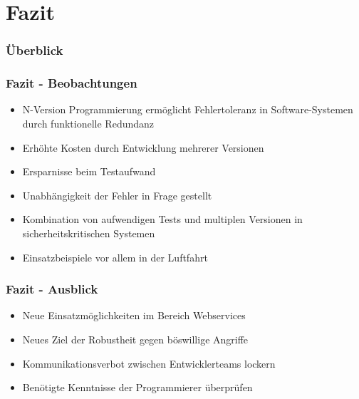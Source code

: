 \section{Fazit}
\begin{frame}
	\frametitle{Überblick}
	\tableofcontents[currentsection]
\end{frame}
%
\begin{frame}
	\frametitle{Fazit - Beobachtungen}

	\begin{itemize}
		\item N-Version Programmierung ermöglicht Fehlertoleranz in Software-Systemen durch funktionelle Redundanz
		\item Erhöhte Kosten durch Entwicklung mehrerer Versionen
		\item Ersparnisse beim Testaufwand
		\item Unabhängigkeit der Fehler in Frage gestellt
		\item Kombination von aufwendigen Tests und multiplen Versionen in sicherheitskritischen Systemen		
		\item Einsatzbeispiele vor allem in der Luftfahrt
	\end{itemize}
\end{frame}
%
%
\begin{frame}
	\frametitle{Fazit - Ausblick}
	
	\begin{itemize}
		\item Neue Einsatzmöglichkeiten im Bereich Webservices
		\item Neues Ziel der Robustheit gegen böswillige Angriffe
		\item Kommunikationsverbot zwischen Entwicklerteams lockern
		\item Benötigte Kenntnisse der Programmierer überprüfen
	\end{itemize}
\end{frame}
%